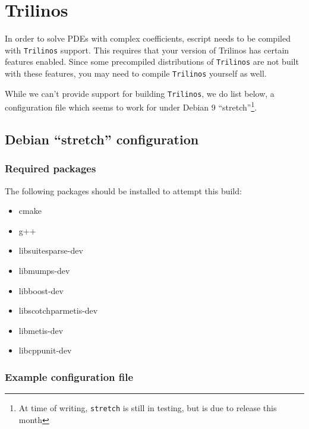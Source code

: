 \chapter{Trilinos}
\label{app:trilinos}

In order to solve PDEs with complex coefficients, escript needs to be compiled with \texttt{Trilinos} support.
This requires that your version of Trilinos has certain features enabled.
Since some precompiled distributions of \texttt{Trilinos} are not built with these features, you may 
need to compile \texttt{Trilinos} yourself as well.

While we can't provide support for building \texttt{Trilinos}, we do list below, a configuration file which seems to work for 
under Debian 9 ``stretch''\footnote{At time of writing, \texttt{stretch} is still in testing, but is due to release this month}.

\section{Debian ``stretch'' configuration}


\subsection{Required packages}

The following packages should be installed to attempt this build:
\begin{itemize}
\item[] cmake
\item[] g++
\item[] libsuitesparse-dev
\item[] libmumps-dev
\item[] libboost-dev
\item[] libscotchparmetis-dev
\item[] libmetis-dev
\item[] libcppunit-dev
\end{itemize}



\subsection{Example configuration file}

